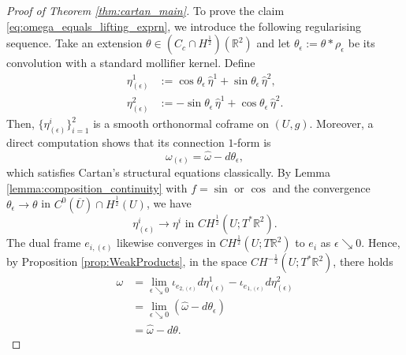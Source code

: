 \documentclass[12pt]{article}
\newcommand{\R}{\mathbb{R}}
\theoremstyle{plain}
\numberwithin{equation}{section}
\begin{document}
\begin{proof}[Proof of Theorem \ref{thm:cartan_main}]
    To prove the claim \eqref{eq:omega_equals_lifting_exprn}, we introduce the following regularising sequence. Take an extension $\theta \in (C_c\cap H^\frac12)(\R^2)$ and let $\theta_\epsilon := \theta * \rho_\epsilon$ be its convolution with a standard mollifier kernel. Define
    \begin{equation} \label{eq:eta_eps_def}
    \begin{split}
        {\eta}^1_{(\epsilon)} &:= \cos\theta_\epsilon\, \hat\eta^1 + \sin\theta_\epsilon\, \hat\eta^2,\\
        {\eta}^2_{(\epsilon)} &:= -\sin\theta_\epsilon\, \hat\eta^1 + \cos\theta_\epsilon\, \hat\eta^2.
    \end{split}
    \end{equation}
    Then, $\{\eta^i_{(\epsilon)}\}_{i=1}^2$ is a smooth orthonormal coframe on $(U,g)$. Moreover, a direct computation shows that its connection $1$-form is
    \begin{equation*}
        \omega_{(\epsilon)} = \hat\omega - d\theta_\epsilon,
    \end{equation*} 
    which satisfies Cartan's structural equations classically. By Lemma \ref{lemma:composition_continuity} with $f = \sin$ or $\cos$ and the convergence $\theta_\epsilon \to \theta$ in $C^0(\overline U) \cap H^\frac12(U)$, we have
    \begin{equation} \label{eq:approx_frame_cartan_conv}
        \eta^i_{(\epsilon)} \to \eta^i \text{ in } CH^\frac12(U;T^*\R^2).
    \end{equation}
    The dual frame $e_{i,(\epsilon)}$ likewise converges in $CH^\frac12(U;T\R^2)$ to $e_i$ as $\epsilon \searrow 0$. Hence, by Proposition \ref{prop:WeakProducts}, in the space $CH^{-\frac12}(U;T^*\R^2)$, there holds
    \begin{align*}
        \omega &= \lim_{\epsilon\searrow 0} \iota_{e_{2,(\epsilon)}}d\eta^1_{(\epsilon)} - \iota_{e_{1,(\epsilon)}}d\eta^2_{(\epsilon)}\\
        &= \lim_{\epsilon \searrow 0} (\hat\omega - d\theta_\epsilon)\\
        &= \hat\omega - d\theta.
    \end{align*}
  

\end{proof}
\end{document}
